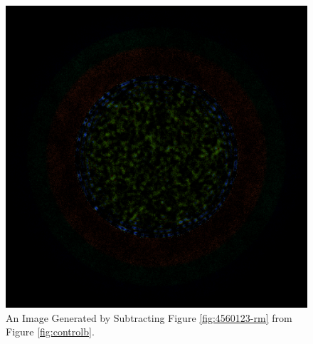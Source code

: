 \begin{figure}[H]
\centering
\includegraphics[width=0.6\linewidth]{figures/shuffle/diff-4560123}
\caption{An Image Generated by Subtracting Figure \ref{fig:4560123-rm} from Figure \ref{fig:controlb}.}
\label{fig:diff-4560123}
\end{figure}